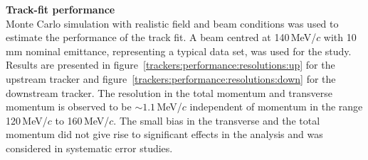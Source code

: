 \noindent\textbf{Track-fit performance} \\
\noindent
Monte Carlo simulation with realistic field
and beam conditions was used to estimate the performance of the track fit.
A beam centred at 140\,MeV/$c$ with 10\,mm nominal emittance,
representing a typical data set, was used for the study.
Results are presented in
figure~\ref{trackers:performance:resolutions:up} for the upstream
tracker and figure~\ref{trackers:performance:resolutions:down} for the
downstream tracker.
The resolution in the total momentum and transverse momentum is
observed to be $\sim1.1$\,MeV/$c$ independent of momentum in the range
120\,MeV/$c$ to 160\,MeV/$c$.
The small bias in the transverse and the total momentum did not give rise to significant effects in the analysis and was considered in systematic error studies.
